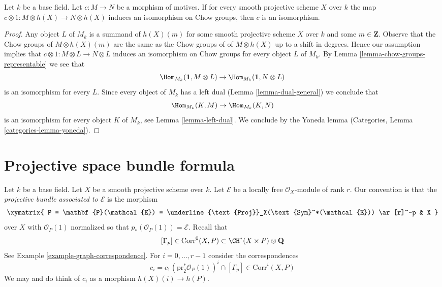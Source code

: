 \begin{lemma}[Manin]
\label{lemma-manin}
Let $k$ be a base field. Let $c : M \to N$ be a morphism of motives.
If for every smooth projective scheme $X$ over $k$ the map
$c \otimes 1 : M \otimes h(X) \to N \otimes h(X)$ induces an isomorphism on
Chow groups, then $c$ is an isomorphism.
\end{lemma}

\begin{proof}
Any object $L$ of $M_k$ is a summand of $h(X)(m)$ for some smooth projective
scheme $X$ over $k$ and some $m \in \mathbf{Z}$. Observe that the Chow groups
of $M \otimes h(X)(m)$ are the same as the Chow groups of of $M \otimes h(X)$
up to a shift in degrees. Hence our assumption implies
that $c \otimes 1 : M \otimes L \to N \otimes L$ induces an isomorphism on
Chow groups for every object $L$ of $M_k$. By
Lemma \ref{lemma-chow-groups-representable}
we see that
$$
\Hom_{M_k}(\mathbf{1}, M \otimes L) \to
\Hom_{M_k}(\mathbf{1}, N \otimes L)
$$
is an isomorphism for every $L$. Since every object of $M_k$ has a left dual
(Lemma \ref{lemma-dual-general}) we conclude that
$$
\Hom_{M_k}(K, M) \to \Hom_{M_k}(K, N)
$$
is an isomorphism for every object $K$ of $M_k$, see
Lemma \ref{lemma-left-dual}. We conclude by the Yoneda lemma
(Categories, Lemma \ref{categories-lemma-yoneda}).
\end{proof}




\section{Projective space bundle formula}
\label{section-projective-space-bundle}

\noindent
Let $k$ be a base field. Let $X$ be a smooth projective scheme over $k$.
Let $\mathcal{E}$ be a locally free $\mathcal{O}_X$-module of rank $r$.
Our convention is that the {\it projective bundle associated to
$\mathcal{E}$} is the morphism
$$
\xymatrix{
P = \mathbf{P}(\mathcal{E}) =
\underline{\text{Proj}}_X(\text{Sym}^*(\mathcal{E}))
\ar[r]^-p
& X
}
$$
over $X$ with $\mathcal{O}_P(1)$ normalized so that
$p_*(\mathcal{O}_P(1)) = \mathcal{E}$. Recall that
$$
[\Gamma_p] \in \text{Corr}^0(X, P) \subset \CH^*(X \times P) \otimes \mathbf{Q}
$$
See Example \ref{example-graph-correspondence}.
For $i = 0, \ldots, r - 1$ consider the correspondences
$$
c_i = c_1(\text{pr}_2^*\mathcal{O}_P(1))^i \cap [\Gamma_p]
\in \text{Corr}^i(X, P)
$$
We may and do think of $c_i$ as a morphism $h(X)(i) \to h(P)$.

